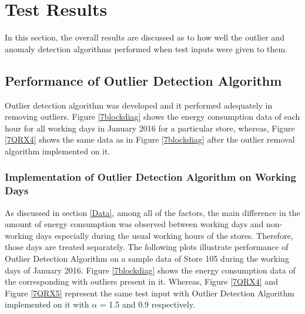 \documentclass[12pt]{article}
\begin{document}






\section{Test Results}\label{Test Results}
In this section, the overall results are discussed as to how well the outlier and anomaly detection algorithms performed when test inputs were given to them.


\subsection{Performance of Outlier Detection Algorithm}

Outlier detection algorithm was developed and it performed adequately in removing outliers. Figure \ref{7blockdiag} shows the energy consumption data of each hour for all working days in January 2016 for a particular store, whereas, Figure \ref{7QRX4} shows the same data as in Figure \ref{7blockdiag} after the outlier removal algorithm implemented on it.

\subsubsection{Implementation of Outlier Detection Algorithm on Working Days}

As discussed in section \ref{Data}, among all of the factors, the main difference in the amount of energy consumption was observed between working days and non-working days especially during the usual working hours of the stores. Therefore, those days are treated separately. The following plots illustrate performance of Outlier Detection Algorithm on a sample data of Store 105 during the working days of January 2016. Figure \ref{7blockdiag} shows the energy consumption data of the corresponding with outliers present in it. Whereas, Figure \ref{7QRX4} and Figure \ref{7QRX5} represent the same test input with Outlier Detection Algorithm implemented on it with $\alpha$ = 1.5 and 0.9 respectively.
\end{document}
